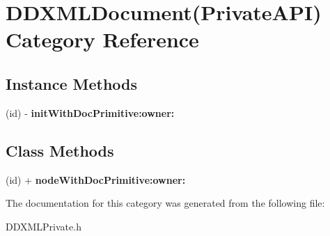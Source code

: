 \hypertarget{category_d_d_x_m_l_document_07_private_a_p_i_08}{}\section{D\+D\+X\+M\+L\+Document(Private\+A\+P\+I) Category Reference}
\label{category_d_d_x_m_l_document_07_private_a_p_i_08}
\subsection*{Instance Methods}
\begin{DoxyCompactItemize}
\item 
\hypertarget{category_d_d_x_m_l_document_07_private_a_p_i_08_a569fafe1eaeddd4731cc8b56142a012e}{}(id) -\/ {\bfseries init\+With\+Doc\+Primitive\+:owner\+:}\label{category_d_d_x_m_l_document_07_private_a_p_i_08_a569fafe1eaeddd4731cc8b56142a012e}

\end{DoxyCompactItemize}
\subsection*{Class Methods}
\begin{DoxyCompactItemize}
\item 
\hypertarget{category_d_d_x_m_l_document_07_private_a_p_i_08_af35340e7c287b74dc8e89ec65c57722e}{}(id) + {\bfseries node\+With\+Doc\+Primitive\+:owner\+:}\label{category_d_d_x_m_l_document_07_private_a_p_i_08_af35340e7c287b74dc8e89ec65c57722e}

\end{DoxyCompactItemize}


The documentation for this category was generated from the following file\+:\begin{DoxyCompactItemize}
\item 
D\+D\+X\+M\+L\+Private.\+h\end{DoxyCompactItemize}
